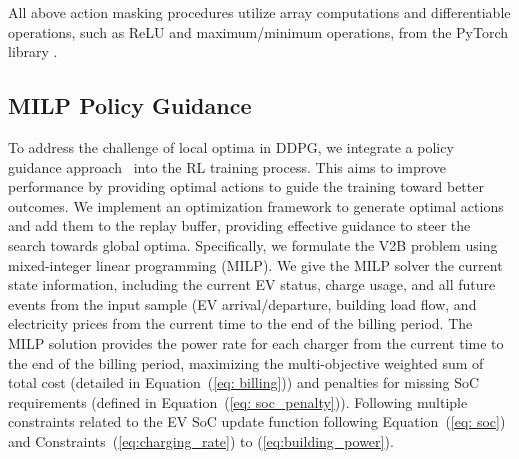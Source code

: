 All above action masking procedures utilize array computations and differentiable operations, such as ReLU \cite{rasamoelina2020review} and maximum/minimum operations, from the PyTorch library \cite{paszke2017automatic}. 















\subsection{MILP Policy Guidance} 

To address the challenge of local optima in DDPG, we  integrate a policy guidance approach~\cite{pmlr-v28-levine13} into the RL training process. This aims to improve performance by providing optimal actions to guide the training toward better outcomes. We implement an optimization framework to generate optimal actions and add them to the replay buffer, providing effective guidance to steer the search towards global optima. Specifically, we formulate the V2B problem using mixed-integer linear programming (MILP). We give the MILP solver the current state information, including the current EV status, charge usage, and all future events from the input sample (EV arrival/departure, building load flow, and electricity prices from the current time to the end of the billing period. The MILP solution provides the power rate for each charger from the current time to the end of the billing period, maximizing the multi-objective weighted sum of total cost (detailed in Equation~(\ref{eq: billing})) and penalties for missing SoC requirements (defined in Equation~(\ref{eq: soc_penalty})). Following multiple constraints related to the EV SoC update  function following Equation~(\ref{eq: soc}) and Constraints~(\ref{eq:charging_rate}) to (\ref{eq:building_power}).   

